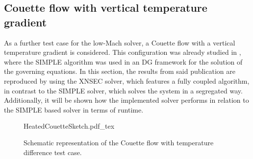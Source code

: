 \subsection{Couette flow with vertical temperature gradient} \label{ssec:CouetteFlowTempDiff}
As a further test case for the low-Mach solver, a Couette flow with a vertical temperature gradient is considered. This configuration was already studied in \textcite{kleinHighorderDiscontinuousGalerkin2016}, where the SIMPLE algorithm was used in an DG framework for the solution of the governing equations. In this section, the results from said publication are reproduced by using the XNSEC solver, which features a fully coupled algorithm, in contrast to the SIMPLE solver, which solves the system in a segregated way. Additionally, it will be shown how the implemented solver performs in relation to the SIMPLE based solver in terms of runtime. %
\begin{figure}[tb]
	\begin{center}
		\def\svgwidth{0.5\textwidth}
		{HeatedCouetteSketch.pdf_tex}
		\vspace{0.2cm}
		\caption{Schematic representation of the Couette flow with temperature difference test case.}\label{fig:CouetteTempDiff_scheme}
	\end{center}
\end{figure}%


